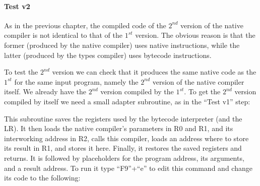 \medskip \paragraph*{Test v2} As in the previous chapter, the compiled
code of the $2^{nd}$ version of the native compiler is not identical to
that of the $1^{st}$ version. The obvious reason is that the former (produced
by the native compiler) uses native instructions, while the latter (produced by
the types compiler) uses bytecode instructions.

To test the $2^{nd}$ version we can check that it produces the same native code
as the $1^{st}$ for the same input program, namely the $2^{nd}$ version of the
native compiler itself. We already have the $2^{nd}$ version compiled by the
$1^{st}$. To get the $2^{nd}$ version compiled by itself we need a small
adapter subroutine, as in the ``Test v1'' step:



This subroutine saves the registers used by the bytecode interpreter (and the
LR). It then loads the native compiler's parameters in R0 and R1, and its
interworking address in R2, calls this compiler, loads an address where to
store its result in R1, and stores it here. Finally, it restores the saved
registers and returns. It is followed by placeholders for the program address,
its arguments, and a result address. To run it type ``F9''+``e'' to edit this
command and change its code to the following:

